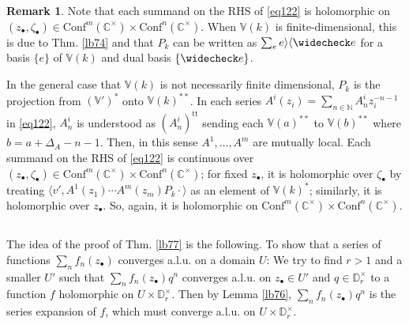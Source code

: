 \documentclass[11pt,b5paper,notitlepage]{article}
\theoremstyle{definition}
\newtheorem{rem}[df]{Remark}
\theoremstyle{plain}
\newcommand{\wch}{\widecheck}
\newcommand{\tr}{\mathrm{t}} %
\newcommand{\Conf}{\mathrm{Conf}}
\newcommand{\bk}[1]{\langle {#1}\rangle}
\newcommand{\blt}{\bullet}
\newcommand{\Vbb}{\mathbb V}
\newcommand{\Cbb}{\mathbb C}
\newcommand{\Nbb}{\mathbb N}
\newcommand{\Dbb}{\mathbb D}
\numberwithin{equation}{section}
\begin{document}
\begin{rem}
Note that each summand on the RHS of \eqref{eq122} is holomorphic on $(z_\blt,\zeta_\blt)\in\Conf^m(\Cbb^\times)\times\Conf^n(\Cbb^\times)$. When $\Vbb(k)$ is finite-dimensional, this is due to Thm. \ref{lb74} and that $P_k$ can be written as $\sum_e e\rangle\langle\wch e$ for a basis $\{e\}$ of $\Vbb(k)$ and dual basis $\{\wch e\}$. 

In the general case that $\Vbb(k)$ is not necessarily finite dimensional, $P_k$ is the projection from $(\Vbb')^*$ onto $\Vbb(k)^{**}$. In each series $A^i(z_i)=\sum_{n\in\Nbb}A^i_nz_i^{-n-1}$ in \eqref{eq122}, $A^i_n$ is understood as $(A^i_n)^{\tr\tr}$ sending each $\Vbb(a)^{**}$ to $\Vbb(b)^{**}$ where $b=a+\Delta_A-n-1$. Then, in this sense $A^1,\dots,A^m$ are mutually local. Each summand on the RHS of \eqref{eq122} is continuous over $(z_\blt,\zeta_\blt)\in\Conf^m(\Cbb^{\times})\times\Conf^n(\Cbb^\times)$; for fixed $z_\blt$, it is holomorphic over $\zeta_\blt$ by treating $\bk{v',A^1(z_1)\cdots A^m(z_m)P_k\cdot}$ as an element of $\Vbb(k)^*$; similarly, it is holomorphic over $z_\blt$. So, again, it is holomorphic on $\Conf^m(\Cbb^\times)\times\Conf^n(\Cbb^\times)$.
\end{rem}


\subsection{}


The idea of the proof of Thm. \ref{lb77} is the following. To show that a series of functions $\sum_n f_n(z_\blt)$ converges a.l.u. on a domain $U$: We try to find $r>1$ and a smaller $U'$ such that $\sum_n f_n(z_\blt)q^n$ converges a.l.u. on $z_\blt\in U'$ and $q\in\Dbb_r^\times$ to a function $f$ holomorphic on $U\times\Dbb_r^\times$. Then by Lemma \ref{lb76}, $\sum_n f_n(z_\blt)q^n$ is the series expansion of $f$, which must converge a.l.u. on $U\times\Dbb_r^\times$. 
\end{document}
